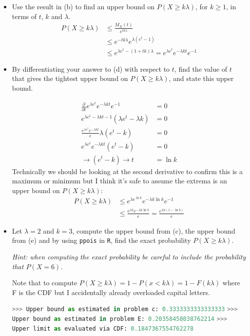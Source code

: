 \documentclass{article}
\newcommand{\1}{\mathbf{1}}
\begin{document}
\begin{itemize}
    \item[d.] Use the result in (b) to find an upper bound on $P(X \geq k\lambda)$, for $k\geq 1$, in terms of $t$, $k$ and $\lambda$.
    \begin{align*}
        P(X \geq k\lambda ) &\leq \frac{M_X(t)}{e^{tk\lambda}} \\
        &\leq e^{-tk\lambda} e^{\lambda(e^t-1)} \\
        &\leq e^{\lambda e^t-(1+tk)\lambda} = e^{\lambda e^t}e^{-\lambda kt}e^{-1}
    \end{align*}
    
    \newpage
    \item[e.] By differentiating your answer to {\color{blue}(d)} with respect to $t$, find the value of $t$ that gives the tightest upper bound on $P(X \geq k\lambda)$, and state this upper bound.
    
    \begin{align*}
        \frac{\partial}{\partial t} e^{\lambda e^t}e^{-\lambda kt}e^{-1} &= 0 \\
        e^{\lambda e^t - \lambda k t - 1}(\lambda e^t - \lambda k) &= 0 \\
        \frac{e^{\lambda e^t}e^{-\lambda kt}}{e} \lambda (e^t - k) &= 0 \\
        e^{\lambda e^t}e^{-\lambda kt} (e^t - k) &= 0 \\
        \rightarrow (e^t - k)  \rightarrow t &= \ln k
    \end{align*}
    Technically we should be looking at the second derivative to confirm this is a maximum or minimum but I think it's safe to assume the extrema is an upper bound on $P(X \geq k\lambda)$:
    \begin{align*}
        P(X \geq k\lambda) &\leq e^{\lambda e^{\ln k}}e^{-\lambda k\ln k}e^{-1} \\
        &\leq \frac{e^{\lambda k}e^{-\lambda k\ln k}}{e} = \frac{e^{\lambda k(1-\ln k)}}{e}
    \end{align*}
    
    \item[f.] Let $\lambda=2$ and $k=3$, compute the upper bound from (c), the upper bound from (e) and by using {\tt ppois} in {\tt R}, find the exact probability $P(X \geq k\lambda)$.\par
    {\it Hint: when computing the exact probability be careful to include the probability that $P(X=6)$.}
    
    Note that to compute $P(X \geq k\lambda) = 1 - P(x<k\lambda) = 1 - F(k\lambda)$ where F is the CDF but I accidentally already overloaded capital letters.
    
    
    \lstinline[language=Python]{>>> Upper bound as estimated in problem c: 0.3333333333333333} \newline
    \lstinline[language=Python]{>>> Upper bound as estimated in problem E: 0.20358458038762214} \newline
    \lstinline[language=Python]{>>> Upper limit as evaluated via CDF: 0.1847367554762278}\newline

\end{itemize}
\end{document}
